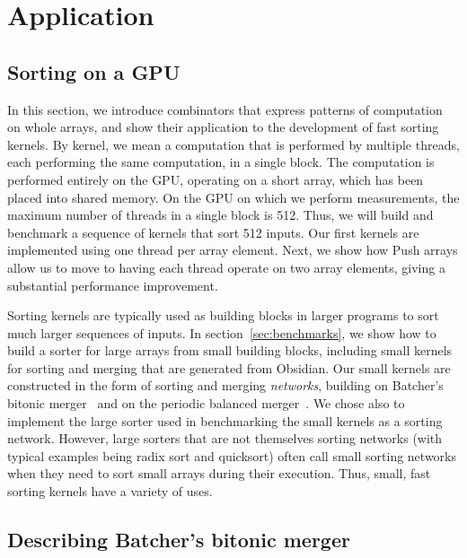 \documentclass[]{sigplanconf}
\begin{document}

  

%
\section{Application}
\label{sec:MARY}

\subsection{Sorting on a GPU}
In this section, we introduce combinators that express patterns
of computation on whole arrays, and show their application to the
development of fast sorting kernels.
By kernel, we mean a computation that is performed by multiple
threads, each performing the same computation, in a single block.
The computation is performed entirely on the GPU, operating on
a short array, which has been placed into shared memory.
On the GPU on which we perform measurements, the maximum number
of threads in a single block is 512. Thus, we will build and benchmark
a sequence of
kernels that sort 512 inputs.
Our first kernels are implemented using one thread per array element.
Next, we show how Push arrays allow us to move to having each
thread operate on two array elements, giving a substantial performance
improvement.

Sorting kernels are typically used as building blocks in larger
programs to sort much larger sequences of inputs. In section~\ref{sec:benchmarks},
we show how to build a sorter for large arrays from small building blocks, including
small kernels for sorting and merging that are generated from Obsidian.
Our small kernels are constructed in the form of sorting and merging {\em networks},
building on Batcher's bitonic merger~\cite{Batcher} and
on the periodic balanced merger~\cite{PeriodicBalanced}.
We chose also to implement the large sorter used  in benchmarking the
small kernels as a sorting network. However, large
sorters that are not themselves sorting networks (with typical examples being radix sort and quicksort) often call small sorting networks when they need to sort small arrays during their execution.
Thus, small, fast sorting kernels have a variety of uses.

\subsection{Describing Batcher's bitonic merger}
\end{document}

